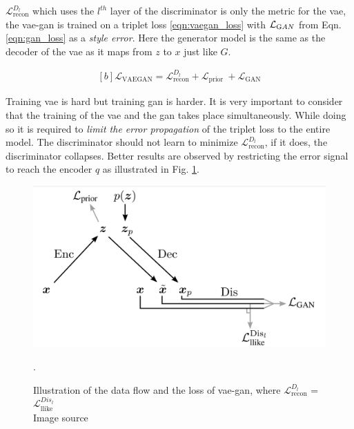 $\mathcal{L}_{\text {recon}}^{D_{l}}$ which uses the $l^{th}$ layer of the discriminator is only the metric for the \ac{vae}, the \ac{vae}-\ac{gan} is trained on a triplet loss \ref{eqn:vaegan_loss} with $\mathcal{L}_{\text GAN}$ from Eqn. \ref{eqn:gan_loss} as a \textit{style error}. Here the generator model is the same as the decoder of the \ac{vae} as it maps from $z$ to $x$ just like $G$.

\begin{equation} \label{eqn:vaegan_loss}
    \begin{gathered}[b]
    \mathcal{L}_{\mathrm{VAEGAN}} = \mathcal{L}_{\text {recon}}^{D_{l}} +\mathcal{L}_{\text {prior }} + \mathcal{L}_{\text {GAN}}
    \end{gathered}
\end{equation}

Training \ac{vae} is hard but training \ac{gan} is harder. It is very important to consider that the training of the \ac{vae} and the \ac{gan} takes place simultaneously. While doing so it is required to \textit{limit the error propagation} of the triplet loss to the entire model. The discriminator should not learn to minimize $\mathcal{L}_{\text {recon}}^{D_{l}}$, if it does, the discriminator collapses. Better results are observed by restricting the error signal to reach the encoder $q$ as illustrated in Fig. \ref{fig:vaegan_loss_graph}. 

\begin{figure}[h]
    \centering
    \includegraphics[scale=0.25]{figures/arch/vae_gan_loss_graph.png}
    \caption{Illustration of the data flow and the loss of \ac{vae}-\ac{gan}, where $\mathcal{L}_{\text {recon}}^{D_{l}}$ = $\mathcal{L}_{\text {llike}}^{Dis_{l}}$ \\
    Image source \cite{autoencoding_beyond_pixels}}. 
    \label{fig:vaegan_loss_graph}
\end{figure}

